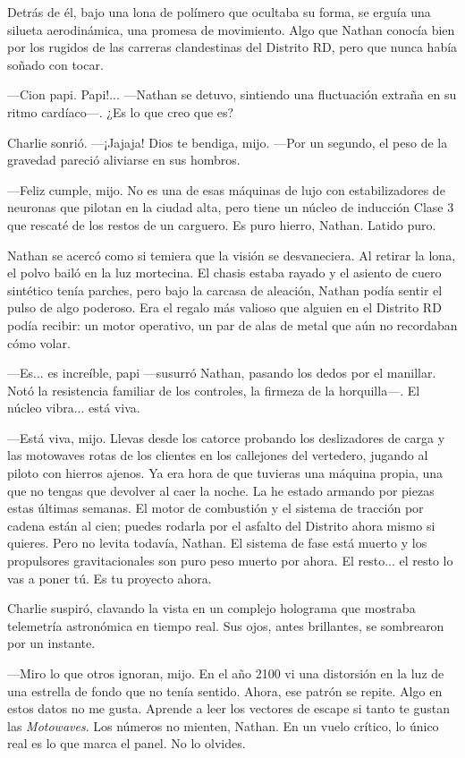 \documentclass[11pt,twoside]{book}
\begin{document}
Detrás de él, bajo una lona de polímero que ocultaba su forma, se erguía una silueta aerodinámica, una promesa de movimiento. Algo que Nathan conocía bien por los rugidos de las carreras clandestinas del Distrito RD, pero que nunca había soñado con tocar.

---Cion papi. Papi!... ---Nathan se detuvo, sintiendo una fluctuación extraña en su ritmo cardíaco---. ¿Es lo que creo que es?

Charlie sonrió. ---¡Jajaja! Dios te bendiga, mijo. ---Por un segundo, el peso de la gravedad pareció aliviarse en sus hombros.

---Feliz cumple, mijo. No es una de esas máquinas de lujo con estabilizadores de neuronas que pilotan en la ciudad alta, pero tiene un núcleo de inducción Clase 3 que rescaté de los restos de un carguero. Es puro hierro, Nathan. Latido puro.

Nathan se acercó como si temiera que la visión se desvaneciera. Al retirar la lona, el polvo bailó en la luz mortecina. El chasis estaba rayado y el asiento de cuero sintético tenía parches, pero bajo la carcasa de aleación, Nathan podía sentir el pulso de algo poderoso. Era el regalo más valioso que alguien en el Distrito RD podía recibir: un motor operativo, un par de alas de metal que aún no recordaban cómo volar.

---Es... es increíble, papi ---susurró Nathan, pasando los dedos por el manillar. Notó la resistencia familiar de los controles, la firmeza de la horquilla---. El núcleo vibra... está viva.

---Está viva, mijo. Llevas desde los catorce probando los deslizadores de carga y las motowaves rotas de los clientes en los callejones del vertedero, jugando al piloto con hierros ajenos. Ya era hora de que tuvieras una máquina propia, una que no tengas que devolver al caer la noche. La he estado armando por piezas estas últimas semanas. El motor de combustión y el sistema de tracción por cadena están al cien; puedes rodarla por el asfalto del Distrito ahora mismo si quieres. Pero no levita todavía, Nathan. El sistema de fase está muerto y los propulsores gravitacionales son puro peso muerto por ahora. El resto... el resto lo vas a poner tú. Es tu proyecto ahora.

Charlie suspiró, clavando la vista en un complejo holograma que mostraba telemetría astronómica en tiempo real. Sus ojos, antes brillantes, se sombrearon por un instante.

---Miro lo que otros ignoran, mijo. En el año 2100 vi una distorsión en la luz de una estrella de fondo que no tenía sentido. Ahora, ese patrón se repite. Algo en estos datos no me gusta. Aprende a leer los vectores de escape si tanto te gustan las \textit{Motowaves}. Los números no mienten, Nathan. En un vuelo crítico, lo único real es lo que marca el panel. No lo olvides.
\end{document}
